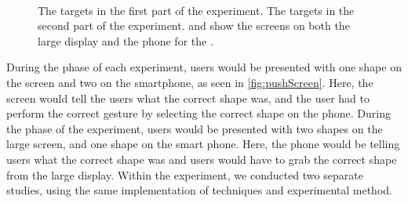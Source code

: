\begin{figure}[H]
	\begin{minipage}[c]{.12\columnwidth}
	\centering
	\\
	\end{minipage}%
	\hspace{0.01\columnwidth}
	\begin{minipage}[c]{.88\columnwidth}
	\centering
	\hspace{0.01\columnwidth}
	\end{minipage}
	\caption{\protect{} The targets in the first part of the experiment. \protect{} The targets in the second part of the experiment. \protect{} and \protect{} show the screens on both the large display and the phone for the \accuracy.}
\end{figure}

During the \push phase of each experiment, users would be presented with one shape on the screen and two on the smartphone, as seen in \cref{fig:pushScreen}.
Here, the screen would tell the users what the correct shape was, and the user had to perform the correct gesture by selecting the correct shape on the phone.
During the \pull phase of the experiment, users would be presented with two shapes on the large screen, and one shape on the smart phone.
Here, the phone would be telling users what the correct shape was and users would have to grab the correct shape from the large display. 
Within the experiment, we conducted two separate studies, using the same implementation of techniques and experimental method. 

